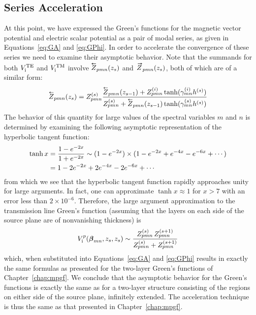 \subsection{Series Acceleration}
At this point, we have expressed the Green's functions for the
magnetic vector potential and electric scalar potential as a pair of
modal series, as given in Equations~\eqref{eq:GA} and
\eqref{eq:GPhi}.  In order to accelerate the convergence of these
series we need to examine their asymptotic behavior.  Note that the
summands for both $V_{\text{i}}^{\text{TE}}$ and $V_{\text{i}}^{\text{TM}}$ involve $\Zleft_{pmn}(z_s)$
and $\Zright_{pmn}(z_s)$, both of which are of a similar form:
\begin{equation}
    \Zleft_{pmn}(z_s) = Z_{pmn}^{(s)} 
    \frac%
    {\Zleft_{pmn}(z_{s-1}) + Z_{pmn}\eye\tanh(\gamma_{mn}\eye h^{(s)})}%
    {Z_{pmn}^{(s)} + \Zleft_{pmn}(z_{s-1})\tanh(\gamma_{mn}^{(s)} h^{(s)})}
\end{equation}
The behavior of this quantity for large values of the spectral
variables $m$ and $n$ is determined by examining the following
asymptotic representation of the hyperbolic tangent function:
\begin{align}
  \tanh x &= \frac{1-e^{-2x}}{1+e^{-2x}}
  \sim (1-e^{-2x}) \times (1 - e^{-2x} + e^{-4x} - e^{-6x} +
  \cdots) \notag \\
  &= 1 - 2e^{-2x} + 2e^{-4x} - 2e^{-6x} + \cdots  
\end{align}
from which we see that the hyperbolic tangent function rapidly
approaches unity for large arguments.  In fact, one can approximate
$\tanh x \approx 1$ for $ x > 7$ with an error less than $2\times
10^{-6}.$ Therefore, the large argument approximation to the
transmission line Green's function  (assuming that the layers on each
side of the source plane are of nonvanishing thickness) is
\begin{equation}
  V_{\text{i}}^p(\boldsymbol{\beta}_{mn},z_s,z_s) \sim
  \frac{Z_{pmn}^{(s)} \, Z_{pmn}^{(s+1)}}{Z_{pmn}^{(s)} + Z_{pmn}^{(s+1)}}
\end{equation}
which, when substituted into Equations~\eqref{eq:GA} and \eqref{eq:GPhi}
results in exactly the same formulas as presented for the two-layer
Green's functions of Chapter~\ref{chap:mpgf}.  We conclude that the
asymptotic behavior for the Green's functions is exactly the same as
for a two-layer structure consisting of the regions on either side of
the source plane, infinitely extended.  The acceleration technique is
thus the same as that presented in Chapter~\ref{chap:mpgf}.

